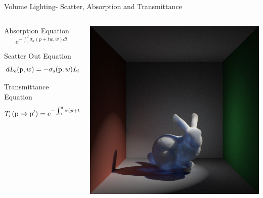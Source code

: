 \documentclass[10pt,compress,professionalfont]{beamer}
\begin{document}
\begin{frame}{Volume Lighting- Scatter, Absorption and Transmittance}


    \begin{columns}
        \begin{column}{0.5\textwidth}

            \begin{block}{Absorption Equation}
                \[
                    e^{-\int_{0}^{d}\sigma_{a} (p+t\mathit{w},\mathit{w})d\mathit{t}}
                \]
            \end{block}

            \begin{block}{Scatter Out Equation}
                \[
                    d\mathit{L}_{o}(\textup{p},w) = -\sigma_{s}(\textup{p},w) \mathit{L}_{i}(\textup{p},-w)dt
                \]
            \end{block}

            \begin{block}{Transmittance Equation}
                \[
                    T_{r}(\textup{p} \to \textup{p}') = e^{-\int_{0}^{d}\sigma (p+t\mathit{w},\mathit{w})d\mathit{t}}.
                \]
            \end{block}

        \end{column}
        \begin{column}{0.5\textwidth}
            \vspace{10mm}
            \includegraphics[width=\textwidth]{../img/bunny_spot/spot_right_new}
        \end{column}
    \end{columns}

\end{frame}
\end{document}

